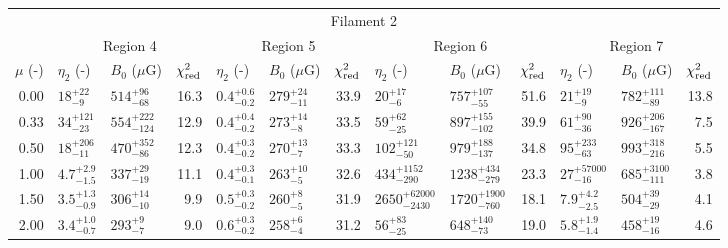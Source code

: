 \begin{tabular}{@{}r llr llr llr llr@{}}
\midrule
\multicolumn{13}{c}{Filament 2} \\
\cmidrule{1-13}
{} & \multicolumn{3}{c}{Region 4}
   & \multicolumn{3}{c}{Region 5}
   & \multicolumn{3}{c}{Region 6}
   & \multicolumn{3}{c}{Region 7} \\
\cmidrule(lr){2-4} \cmidrule(lr){5-7} \cmidrule(lr){8-10} \cmidrule(l){11-13}
$\mu$ (-) & $\eta_2$ (-) & $B_0$ ($\mu$G) & $\chi^2_{\mathrm{red}}$
          & $\eta_2$ (-) & $B_0$ ($\mu$G) & $\chi^2_{\mathrm{red}}$
          & $\eta_2$ (-) & $B_0$ ($\mu$G) & $\chi^2_{\mathrm{red}}$
          & $\eta_2$ (-) & $B_0$ ($\mu$G) & $\chi^2_{\mathrm{red}}$ \\
\cmidrule{1-13}
0.00 & ${18}^{+22}_{-9}$ & ${514}^{+96}_{-68}$ & 16.3
     & ${0.4}^{+0.6}_{-0.2}$ & ${279}^{+24}_{-11}$ & 33.9
     & ${20}^{+17}_{-6}$ & ${757}^{+107}_{-55}$ & 51.6
     & ${21}^{+19}_{-9}$ & ${782}^{+111}_{-89}$ & 13.8 \\
0.33 & ${34}^{+121}_{-23}$ & ${554}^{+222}_{-124}$ & 12.9
     & ${0.4}^{+0.4}_{-0.2}$ & ${273}^{+14}_{-8}$ & 33.5
     & ${59}^{+62}_{-25}$ & ${897}^{+155}_{-102}$ & 39.9
     & ${61}^{+90}_{-36}$ & ${926}^{+206}_{-167}$ & 7.5 \\
0.50 & ${18}^{+206}_{-11}$ & ${470}^{+352}_{-86}$ & 12.3
     & ${0.4}^{+0.3}_{-0.2}$ & ${270}^{+13}_{-7}$ & 33.3
     & ${102}^{+121}_{-50}$ & ${979}^{+188}_{-137}$ & 34.8
     & ${95}^{+233}_{-63}$ & ${993}^{+318}_{-216}$ & 5.5 \\
1.00 & ${4.7}^{+2.9}_{-1.5}$ & ${337}^{+29}_{-19}$ & 11.1
     & ${0.4}^{+0.3}_{-0.1}$ & ${263}^{+10}_{-5}$ & 32.6
     & ${434}^{+1152}_{-290}$ & ${1238}^{+434}_{-279}$ & 23.3
     & ${27}^{+57000}_{-16}$ & ${685}^{+3100}_{-111}$ & 3.8 \\
1.50 & ${3.5}^{+1.3}_{-0.9}$ & ${306}^{+14}_{-10}$ & 9.9
     & ${0.5}^{+0.3}_{-0.2}$ & ${260}^{+8}_{-5}$ & 31.9
     & ${2650}^{+62000}_{-2430}$ & ${1720}^{+1900}_{-760}$ & 18.1
     & ${7.9}^{+4.2}_{-2.5}$ & ${504}^{+39}_{-29}$ & 4.1 \\
2.00 & ${3.4}^{+1.0}_{-0.7}$ & ${293}^{+9}_{-7}$ & 9.0
     & ${0.6}^{+0.3}_{-0.2}$ & ${258}^{+6}_{-4}$ & 31.2
     & ${56}^{+83}_{-25}$ & ${648}^{+140}_{-73}$ & 19.0
     & ${5.8}^{+1.9}_{-1.4}$ & ${458}^{+19}_{-16}$ & 4.6 \\


\end{tabular}
